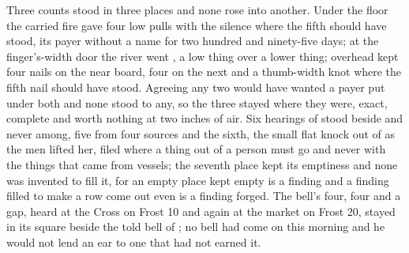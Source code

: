 \scenebreak

Three counts stood in three places and none rose into another. Under the floor the carried fire gave four low pulls with the silence where the fifth should have stood, its payer without a name for two hundred and ninety-five days; at the finger's-width door the river went , a low thing over a lower thing; overhead  kept four nails on the near board, four on the next and a thumb-width knot where the fifth nail should have stood. Agreeing any two would have wanted a payer put under both and none stood to any, so the three stayed where they were, exact, complete and worth nothing at two inches of air. Six hearings of  stood beside and never among, five from four sources and the sixth, the small flat knock out of  as the men lifted her, filed where a thing out of a person must go and never with the things that came from vessels; the seventh place kept its emptiness and none was invented to fill it, for an empty place kept empty is a finding and a finding filled to make a row come out even is a finding forged. The bell's four, four and a gap, heard at the Cross on Frost 10 and again at the market on Frost 20, stayed in its square beside the told bell of ; no bell had come on this morning and he would not lend an ear to one that had not earned it.

